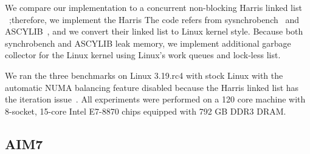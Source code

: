 
We compare our  implementation to a concurrent non-blocking Harris
linked list ~\cite{Harris2001Lockfree};therefore, we implement the Harris
The code refers from sysnchrobench~\cite{Gramoli2015Synchrobench} and
ASCYLIB~\cite{David2015ASYNCHRONIZED}, and we convert their linked list to
Linux kernel style.
Because both synchrobench and ASCYLIB leak memory, we implement additional
garbage collector for the Linux kernel using Linux's work queues and lock-less
list.



We ran the three benchmarks on Linux 3.19.rc4 with stock Linux with 
the automatic NUMA balancing feature disabled because the
Harris linked list has the iteration issue~\cite{petrank2013lock}. 
All experiments were performed on a 120 core machine with 8-socket, 15-core
Intel E7-8870 chips equipped with 792 GB DDR3 DRAM.


\subsection{AIM7}

